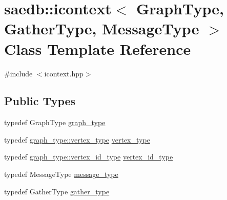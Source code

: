 \hypertarget{classsaedb_1_1icontext}{\section{saedb\-:\-:icontext$<$ Graph\-Type, Gather\-Type, Message\-Type $>$ Class Template Reference}
\label{d6/d73/classsaedb_1_1icontext}
}


{\ttfamily \#include $<$icontext.\-hpp$>$}

\subsection*{Public Types}
\begin{DoxyCompactItemize}
\item 
typedef Graph\-Type \hyperlink{classsaedb_1_1icontext_a8eeb99ff6eb90e3f096a2895f9b92653}{graph\-\_\-type}
\item 
typedef \hyperlink{structsaedb_1_1sae__graph_1_1vertex__type}{graph\-\_\-type\-::vertex\-\_\-type} \hyperlink{classsaedb_1_1icontext_ab83a38ba860cb2101b499ae60675e4e5}{vertex\-\_\-type}
\item 
typedef \hyperlink{classsaedb_1_1sae__graph_a2f9a7bf2db556689f1cd9de9562ff41f}{graph\-\_\-type\-::vertex\-\_\-id\-\_\-type} \hyperlink{classsaedb_1_1icontext_ac130cf374063f27748e4770617971660}{vertex\-\_\-id\-\_\-type}
\item 
typedef Message\-Type \hyperlink{classsaedb_1_1icontext_a7bd82d8486ab08dc1adf49dd6d659059}{message\-\_\-type}
\item 
typedef Gather\-Type \hyperlink{classsaedb_1_1icontext_a7c3ae1019b418faf3de68ab9396f867b}{gather\-\_\-type}
\end{DoxyCompactItemize}
